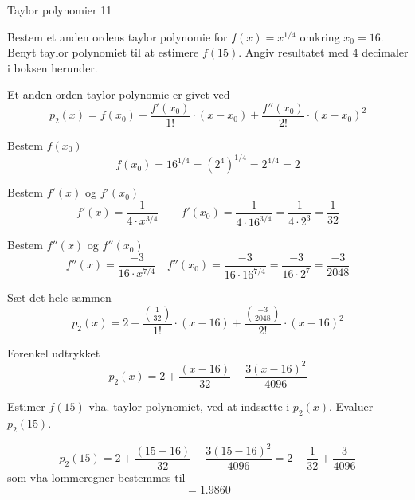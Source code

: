\documentclass{article}
\begin{document}
\begin{exercise}{Taylor polynomier 11}
	
	Bestem et anden ordens taylor polynomie for $f(x) =x^{1/4}$ 
	omkring $x_0 = 16$.
	Benyt taylor polynomiet til at estimere $f(15)$.
	Angiv resultatet med 4 decimaler i boksen herunder.
	
	\hint
	Et anden orden taylor polynomie 
	er givet ved
	\[
	p_2(x) = f(x_0) + \frac{f'(x_0)}{1!} \cdot (x - x_0)
	+ \frac{f''(x_0)}{2!} \cdot (x - x_0)^2
	\]
	
	
	\hint
	Bestem $f(x_0)$
	\[
	f(x_0) = 16^{1/4}  = \left(2^4\right)^{1/4} = 2^{4/4} = 2
	\]
	
	\hint
	Bestem $f'(x)$ og $f'(x_0)$
	\[
	f'(x) = \frac{1}{4 \cdot x^{3/4}} \qquad f'(x_0) = \frac{1}{4 \cdot 16^{3/4}} = \frac{1}{4 \cdot 2^3} = \frac{1}{32} 
	\]
	
	\hint
	Bestem $f''(x)$ og $f''(x_0)$
	\[
	f''(x) =\frac{-3}{16 \cdot x^{7/4}}  \quad f''(x_0) = \frac{-3}{16 \cdot 16^{7/4}} = \frac{-3}{16 \cdot 2^7} = \frac{-3}{2048}
	\]
	
	
	\hint
	Sæt det hele sammen
	\[
	p_2(x) = 2 + \frac{ \left(\frac{1}{32} \right)}{1!} \cdot (x-16) + \frac{ \left( \frac{-3}{2048}\right)}{2!} \cdot (x-16)^2
	\]
	
	\hint
	Forenkel udtrykket
	\[
	p_2(x) = 2 + \frac{(x-16)}{32} - \frac{3(x-16)^2}{4096}
	\]
	
	\hint
	Estimer $f(15)$ vha. taylor polynomiet, ved at indsætte i $p_2(x)$.
	Evaluer $p_2(15)$.
	
	\hint
	\[
	p_2(15) = 2 + \frac{(15-16)}{32} - \frac{3(15-16)^2}{4096} = 2 - \frac{1}{32} + \frac{3}{4096}
	\]
	som vha lommeregner bestemmes til
	\[
	= 1.9860
	\]
\end{exercise}
\end{document}
